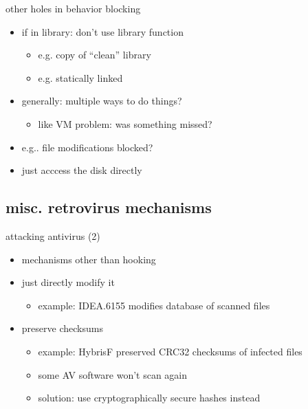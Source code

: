 \begin{frame}{other holes in behavior blocking}
    \begin{itemize}
    \item if in library: don't use library function
        \begin{itemize}
        \item e.g. copy of ``clean'' library
        \item e.g. statically linked
        \end{itemize}
    \item generally: multiple ways to do things?
        \begin{itemize}
        \item like VM problem: was something missed?
        \end{itemize}
    \vspace{.5cm}
    \item e.g.. file modifications blocked?
    \item just acccess the disk directly
    \end{itemize}
\end{frame}

\subsection{misc. retrovirus mechanisms}

\begin{frame}{attacking antivirus (2)}
    \begin{itemize}
    \item mechanisms other than hooking
    \item just directly modify it
        \begin{itemize}
        \item example: IDEA.6155 modifies database of scanned files
        \end{itemize}
    \item preserve checksums
        \begin{itemize}
        \item example: HybrisF preserved CRC32 checksums of infected files
        \item some AV software won't scan again
        \item solution: use cryptographically secure hashes instead
        \end{itemize}
    \end{itemize}
\end{frame}

